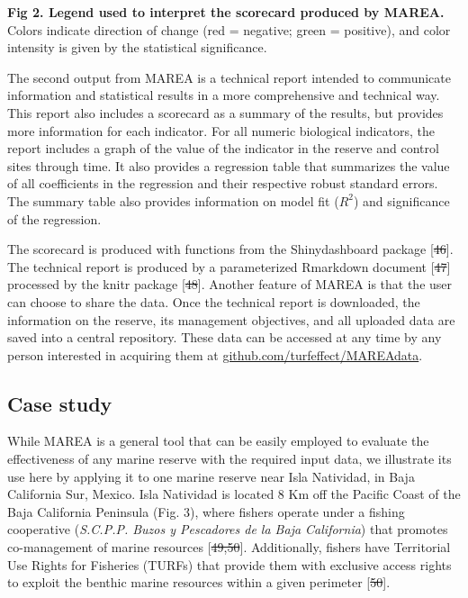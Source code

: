 \documentclass[12pt,]{article}
\providecommand{\DIFaddtex}[1]{{\protect\color{blue}\uwave{#1}}} %
\providecommand{\DIFdeltex}[1]{{\protect\color{red}\sout{#1}}}                      %
\providecommand{\DIFaddbegin}{} %
\providecommand{\DIFaddend}{} %
\providecommand{\DIFdelbegin}{} %
\providecommand{\DIFdelend}{} %
\providecommand{\DIFadd}[1]{\texorpdfstring{\DIFaddtex{#1}}{#1}} %
\providecommand{\DIFdel}[1]{\texorpdfstring{\DIFdeltex{#1}}{}} %
\newcommand{\DIFscaledelfig}{0.5}
\newlength{\DIFdelgraphicswidth} %
\newlength{\DIFdelgraphicsheight} %
\newcommand{\DIFaddincludegraphics}[2][]{{\color{blue}\fbox{\DIFOincludegraphics[#1]{#2}}}} %
\newcommand{\DIFdelincludegraphics}[2][]{%
\sbox{\DIFdelgraphicsbox}{\DIFOincludegraphics[#1]{#2}}%
\settoboxwidth{\DIFdelgraphicswidth}{\DIFdelgraphicsbox} %
\settoboxtotalheight{\DIFdelgraphicsheight}{\DIFdelgraphicsbox} %
\scalebox{\DIFscaledelfig}{%
\parbox[b]{\DIFdelgraphicswidth}{\usebox{\DIFdelgraphicsbox}\\[-\baselineskip] \rule{\DIFdelgraphicswidth}{0em}}\llap{\resizebox{\DIFdelgraphicswidth}{\DIFdelgraphicsheight}{%
\setlength{\unitlength}{\DIFdelgraphicswidth}%
\begin{picture}(1,1)%
\thicklines\linethickness{2pt} %
{\color[rgb]{1,0,0}\put(0,0){\framebox(1,1){}}}%
{\color[rgb]{1,0,0}\put(0,0){\line( 1,1){1}}}%
{\color[rgb]{1,0,0}\put(0,1){\line(1,-1){1}}}%
\end{picture}%
}\hspace*{3pt}}} %
} %
\DeclareRobustCommand{\DIFaddbegin}{\DIFOaddbegin \let\includegraphics\DIFaddincludegraphics} %
\DeclareRobustCommand{\DIFaddend}{\DIFOaddend \let\includegraphics\DIFOincludegraphics} %
\DeclareRobustCommand{\DIFdelbegin}{\DIFOdelbegin \let\includegraphics\DIFdelincludegraphics} %
\DeclareRobustCommand{\DIFdelend}{\DIFOaddend \let\includegraphics\DIFOincludegraphics} %
\begin{document}
\textbf{Fig 2. Legend used to interpret the scorecard produced by
MAREA.} Colors indicate direction of change (red = negative; green =
positive), and color intensity is given by the statistical significance.

The second output from MAREA is a technical report intended to
communicate information and statistical results in a more comprehensive
and technical way. This report also includes a scorecard as a summary of
the results, but provides more information for each indicator. For all
numeric biological indicators, the report includes a graph of the value
of the indicator in the reserve and control sites through time. It also
provides a regression table that summarizes the value of all
coefficients in the regression and their respective robust standard
errors. The summary table also provides information on model fit
(\(R^2\)) and significance of the regression.

The scorecard is produced with functions from the Shinydashboard package
{[}\DIFdelbegin \DIFdel{46}\DIFdelend \DIFaddbegin \DIFadd{52}\DIFaddend {]}. The technical report is produced by a parameterized Rmarkdown
document {[}\DIFdelbegin \DIFdel{47}\DIFdelend \DIFaddbegin \DIFadd{53}\DIFaddend {]} processed by the knitr package {[}\DIFdelbegin \DIFdel{48}\DIFdelend \DIFaddbegin \DIFadd{54}\DIFaddend {]}. Another
feature of MAREA is that the user can choose to share the data. Once the
technical report is downloaded, the information on the reserve, its
management objectives, and all uploaded data are saved into a central
repository. These data can be accessed at any time by any person
interested in acquiring them at \url{github.com/turfeffect/MAREAdata}.

\subsection{Case study}\label{case-study}

While MAREA is a general tool that can be easily employed to evaluate
the effectiveness of any marine reserve with the required input data, we
illustrate its use here by applying it to one marine reserve near Isla
Natividad, in Baja California Sur, Mexico. Isla Natividad is located 8
Km off the Pacific Coast of the Baja California Peninsula (Fig. 3),
where fishers operate under a fishing cooperative (\emph{S.C.P.P. Buzos
y Pescadores de la Baja California}) that promotes co-management of
marine resources {[}\DIFdelbegin \DIFdel{49,50}\DIFdelend \DIFaddbegin \DIFadd{55,56}\DIFaddend {]}. Additionally, fishers have Territorial Use
Rights for Fisheries (TURFs) that provide them with exclusive access
rights to exploit the benthic marine resources within a given perimeter
{[}\DIFdelbegin \DIFdel{50}\DIFdelend \DIFaddbegin \DIFadd{56}\DIFaddend {]}.
\end{document}
